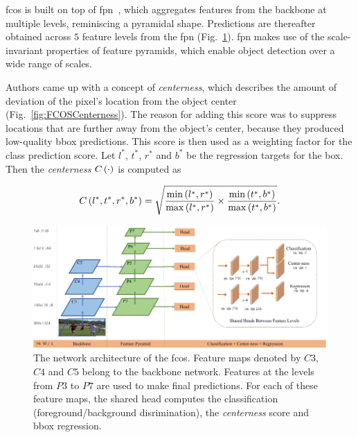\Gls{fcos} is built on top of \gls{fpn}~\cite{Li2019}, which aggregates features from the backbone at multiple levels, reminiscing a pyramidal shape. Predictions are thereafter obtained across $5$ feature levels from the \gls{fpn} (Fig.~\ref{fig:FCOSFeaturePyramid}). \gls{fpn} makes use of the scale-invariant properties of feature pyramids, which enable object detection over a wide range of scales.

Authors came up with a concept of \emph{centerness}, which describes the amount of deviation of the pixel's location from the object center (Fig.~\ref{fig:FCOSCenterness}). The reason for adding this score was to suppress locations that are further away from the object's center, because they produced low-quality \gls{bbox} predictions. This score is then used as a weighting factor for the class prediction score. Let $l^*$, $t^*$, $r^*$ and $b^*$ be the regression targets for the box. Then the \emph{centerness} ${C} \left( \cdot \right)$ is computed as

\begin{equation}
    \label{eq:CenternessDetection}
    {C} \left( l^*, t^*, r^*, b^* \right) =
    \sqrt{
        \frac{
            {\min} \left( l^*, r^* \right)
        }{
            {\max} \left( l^*, r^* \right)
        }
        \times
        \frac{
            {\min} \left( t^*, b^* \right)
        }{
            {\max} \left( t^*, b^* \right)
        }
    }.
\end{equation}


\begin{figure}[t]
    \centerline{\includegraphics[width=\linewidth]{figures/theoretical_foundations/fcos_feature_pyramid.pdf}}
    \caption[\Gls{fcos} architecture]{The network architecture of the \gls{fcos}. Feature maps denoted by $C3$, $C4$ and $C5$ belong to the backbone network. Features at the levels from $P3$ to $P7$ are used to make final predictions. For each of these feature maps, the shared head computes the classification (foreground/background disrimination), the \emph{centerness} score and \gls{bbox} regression. }
    \label{fig:FCOSFeaturePyramid}
\end{figure}

